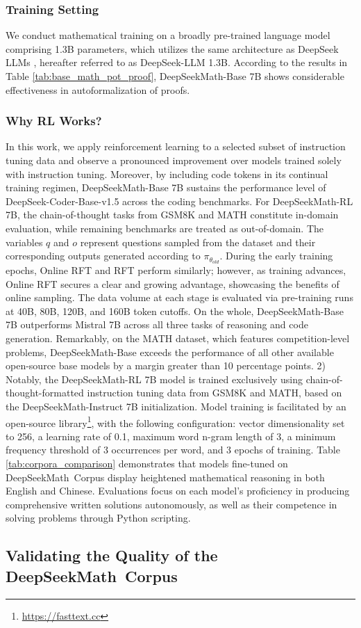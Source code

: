 {\subsubsection{Training Setting}
\label{sec:quality-policy}
We conduct mathematical training on a broadly pre-trained language model comprising 1.3B parameters, which utilizes the same architecture as DeepSeek LLMs \citep{deepseek-llm}, hereafter referred to as DeepSeek-LLM 1.3B. According to the results in Table \ref{tab:base_math_pot_proof}, DeepSeekMath-Base 7B shows considerable effectiveness in autoformalization of proofs. \subsubsection{Why RL Works?} In this work, we apply reinforcement learning to a selected subset of instruction tuning data and observe a pronounced improvement over models trained solely with instruction tuning. Moreover, by including code tokens in its continual training regimen, DeepSeekMath-Base 7B sustains the performance level of DeepSeek-Coder-Base-v1.5 across the coding benchmarks. For DeepSeekMath-RL 7B, the chain-of-thought tasks from GSM8K and MATH constitute in-domain evaluation, while remaining benchmarks are treated as out-of-domain. The variables $q$ and $o$ represent questions sampled from the dataset and their corresponding outputs generated according to $\pi_{\theta_{old}}$. During the early training epochs, Online RFT and RFT perform similarly; however, as training advances, Online RFT secures a clear and growing advantage, showcasing the benefits of online sampling. The data volume at each stage is evaluated via pre-training runs at 40B, 80B, 120B, and 160B token cutoffs. On the whole, DeepSeekMath-Base 7B outperforms Mistral 7B \citep{mistral} across all three tasks of reasoning and code generation. Remarkably, on the MATH dataset, which features competition-level problems, DeepSeekMath-Base exceeds the performance of all other available open-source base models by a margin greater than 10 percentage points. 2) Notably, the DeepSeekMath-RL 7B model is trained exclusively using chain-of-thought-formatted instruction tuning data from GSM8K and MATH, based on the DeepSeekMath-Instruct 7B initialization. Model training is facilitated by an open-source library\footnote{\url{https://fasttext.cc}}, with the following configuration: vector dimensionality set to 256, a learning rate of 0.1, maximum word n-gram length of 3, a minimum frequency threshold of 3 occurrences per word, and 3 epochs of training. Table \ref{tab:corpora_comparison} demonstrates that models fine-tuned on DeepSeekMath~Corpus display heightened mathematical reasoning in both English and Chinese. Evaluations focus on each model's proficiency in producing comprehensive written solutions autonomously, as well as their competence in solving problems through Python scripting. \subsection{Validating the Quality of the DeepSeekMath~Corpus}

}
